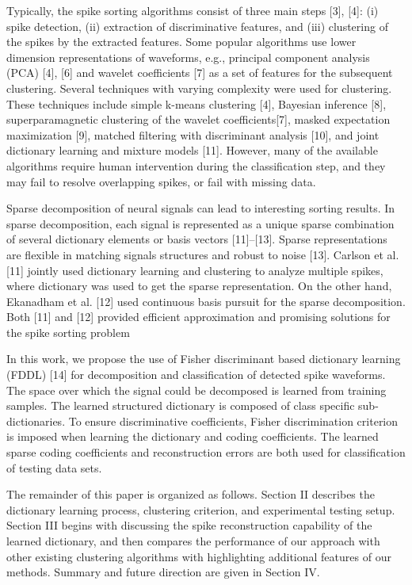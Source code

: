 \documentclass[conference]{IEEEtran}
\begin{document}
	Typically, the spike sorting algorithms consist of three main steps [3], [4]: (i) spike detection, (ii) extraction of discriminative features, and (iii) clustering of the spikes by the extracted features. Some popular algorithms use lower dimension representations of waveforms, e.g., principal component analysis (PCA) [4], [6] and wavelet coefficients [7] as a set of features for the subsequent clustering. Several techniques with varying complexity were used for clustering. These techniques include simple k-means clustering [4], Bayesian inference [8], superparamagnetic clustering of the wavelet coefficients[7], masked expectation maximization [9], matched filtering with discriminant analysis [10], and joint dictionary learning and mixture models [11]. However, many of the available algorithms require human intervention during the classification step, and they may fail to resolve overlapping spikes, or fail with missing data.
	
	Sparse decomposition of neural signals can lead to interesting sorting results. In sparse decomposition, each signal is represented as a unique sparse combination of several dictionary elements or basis vectors [11]–[13]. Sparse representations are flexible in matching signals structures and robust to noise [13]. Carlson et al. [11] jointly used dictionary learning and clustering to analyze multiple spikes, where dictionary was used to get the sparse representation. On the other hand, Ekanadham et al. [12] used continuous basis pursuit for the sparse decomposition. Both [11] and [12] provided efficient approximation and promising solutions for the spike sorting problem
	
	In this work, we propose the use of Fisher discriminant based dictionary learning (FDDL) [14] for decomposition and classification of detected spike waveforms. The space over which the signal could be decomposed is learned from training samples. The learned structured dictionary is composed of class specific sub-dictionaries. To ensure discriminative coefficients, Fisher discrimination criterion is imposed when learning the dictionary and coding coefficients. The learned sparse coding coefficients and reconstruction errors are both used for classification of testing data sets.
	
	The remainder of this paper is organized as follows. Section II describes the dictionary learning process, clustering criterion, and experimental testing setup. Section III begins with discussing the spike reconstruction capability of the learned dictionary, and then compares the performance of our approach with other existing clustering algorithms with highlighting additional features of our methods. Summary and future direction are given in Section IV.
	
\end{document}
